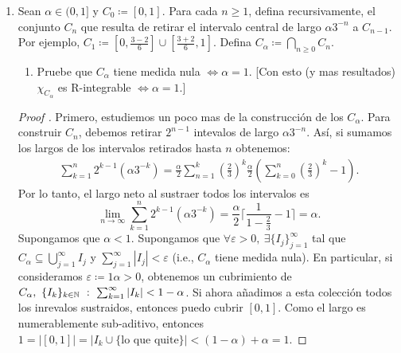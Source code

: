 \documentclass[a4paper]{report}
\begin{document}
\begin{enumerate}
	\item Sean $\alpha \in (0,1]$ y $C_0 \coloneq [0,1]$. Para cada $n\geq 1$, defina recursivamente, el conjunto $C_n$ que resulta de retirar el intervalo central de largo $\alpha 3^{-n}$ a $C_{n-1}$. Por ejemplo, $C_1 \coloneq \left[ 0,\frac{3-2}{6} \right] \cup \left[ \frac{3+2}{6},1 \right]$. Defina $C_{\alpha} \coloneq \displaystyle\bigcap_{n\geq 0} C_n$.
	\begin{enumerate}
		\item Pruebe que $C_{\alpha}$ tiene medida nula $\iff \alpha = 1$. [Con esto (y mas resultados) $\chi_{C_{\alpha}}$ es R-integrable $\iff \alpha = 1$.]
	\end{enumerate}
	\begin{proof}[Proof ]
		Primero, estudiemos un poco mas de la construcción de los $C_{\alpha}$. Para construir $C_n$, debemos retirar $2^{n-1}$ intevalos de largo $\alpha 3^{-n}$. Así, si sumamos los largos de los intervalos retirados hasta $n$ obtenemos:
		\begin{align*}
			\sum_{k=1}^{n} 2^{k-1}(\alpha 3^{-k}) = \frac{\alpha}{2} \sum_{n=1}^{k} \left( \frac{2}{3} \right)^k \frac{\alpha}{2} \left( \sum_{k=0}^{n} \left( \frac{2}{3} \right)^k - 1 \right)
		.\end{align*}
		Por lo tanto, el largo neto al sustraer todos los intervalos es 
		\[ \lim_{n \to \infty} \sum_{k=1}^{n} 2^{k-1} (\alpha 3^{-k}) = \frac{\alpha}{2}  \lceil \frac{1}{1-\frac{2}{3}} -1 \rceil = \alpha. \]
		Supongamos que $\alpha < 1$. Supongamos que $\forall \varepsilon > 0,\ \exists \{ I_j \}_{j=1}^{\infty}$ tal que $C_{\alpha} \subseteq \displaystyle\bigcup_{j=1}^{\infty} I_j$ y $\sum_{j=1}^{\infty} |I_j| < \varepsilon$ (i.e., $C_{\alpha}$ tiene medida nula). En particular, si consideramos $\varepsilon \coloneq 1 \alpha > 0$, obtenemos un cubrimiento de $C_{\alpha},\ \{I_k\}_{k\in\N}\ : \ \sum_{k=1}^{\infty} |I_k| < 1 - \alpha$. Si ahora añadimos a esta colección todos los inrevalos sustraidos, entonces puedo cubrir $[0,1]$. Como el largo es numerablemente sub-aditivo, entonces $1 = |[0,1]| = | I_k \cup \{\text{lo que quite}\}|< (1-\alpha) + \alpha = 1$.      
	\end{proof}
\end{enumerate}
\end{document}
